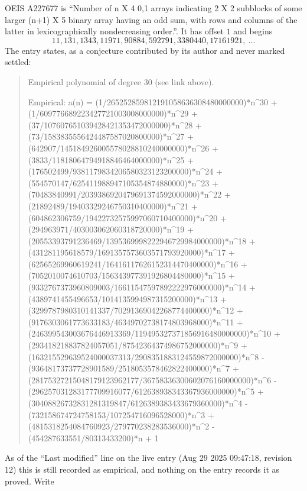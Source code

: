 \documentclass[11pt,a4paper]{article}
\theoremstyle{plain}
\theoremstyle{definition}
\begin{document}
OEIS A227677 is ``Number of n X 4 0,1 arrays indicating 2 X 2 subblocks of some larger (n+1) X 5 binary array having an odd sum, with rows and columns of the latter in lexicographically nondecreasing order.''. It has offset $1$ and begins
\[
11, 131, 1343, 11971, 90884, 592791, 3380440, 17161921,\ \dots
\]
The entry states, as a conjecture contributed by its author and never marked settled:
\begin{quote}\raggedright\small
Empirical polynomial of degree 30 (see link above).

Empirical: a(n) = (1/265252859812191058636308480000000)*n\^{}30 + (1/609776689223427721003008000000)*n\^{}29 + (37/107607651039428421353472000000)*n\^{}28 + (73/1583835556424487587020800000)*n\^{}27 + (642907/145184926005578028810240000000)*n\^{}26 + (3833/11818064794918846464000000)*n\^{}25 + (176502499/9381179834206580323123200000)*n\^{}24 + (554570147/625411988947105354874880000)*n\^{}23 + (70483840991/2039386920479691374592000000)*n\^{}22 + (21892489/19403329246750310400000)*n\^{}21 + (604862306759/19422732575997060710400000)*n\^{}20 + (294963971/403003062060318720000)*n\^{}19 + (20553393791236469/1395369998222946729984000000)*n\^{}18 + (431281195618579/1691357573603571793920000)*n\^{}17 + (62565269960619241/16416117626152314470400000)*n\^{}16 + (7052010074610703/156343977391926804480000)*n\^{}15 + (9332767373960809003/16611547597892222976000000)*n\^{}14 + (4389741455496653/1014135994987315200000)*n\^{}13 + (3299787980310141337/70291369042268774400000)*n\^{}12 + (9176303061773633183/46349702738174803968000)*n\^{}11 + (246399543003676446913369/119495327371856916480000000)*n\^{}10 + (293418218837824057051/87542364374986752000000)*n\^{}9 + (163215529639524000037313/2908351883124559872000000)*n\^{}8 - (93648173737728901589/2518053578462822400000)*n\^{}7 + (28175327215048179123962177/36758336300602076160000000)*n\^{}6 - (296257031283177709916077/612638938343367936000000)*n\^{}5 + (30408826732831281319847/6126389383433679360000)*n\^{}4 - (732158674724758153/107254716096528000)*n\^{}3 + (4815318254084760923/279770238283536000)*n\^{}2 - (454287633551/80313433200)*n + 1
\end{quote}
As of the ``Last modified'' line on the live entry (Aug 29 2025 09:47:18, revision 12) this is still
recorded as empirical, and nothing on the entry records it as proved. Write
\end{document}
